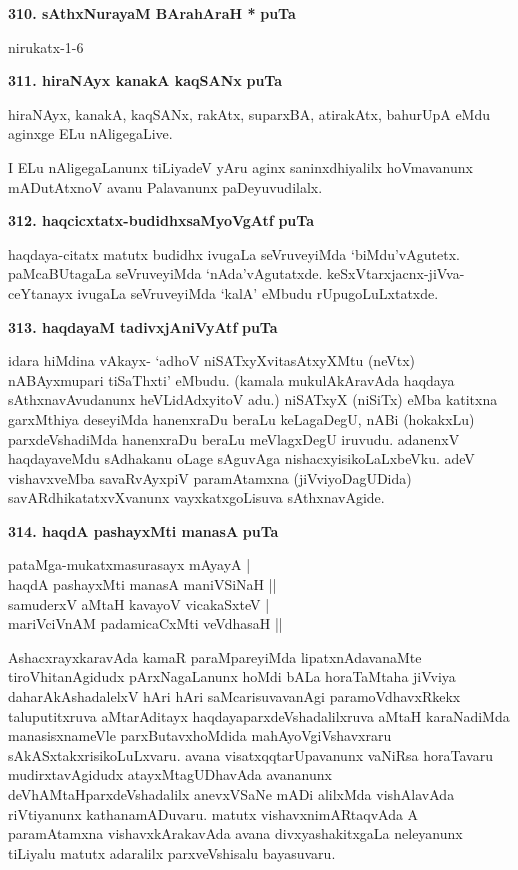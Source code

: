 \noindent
\textbf{310. sAthxNurayaM BArahAraH *} \hfill {\bf puTa }

\hfill nirukatx-1-6

\medskip
\noindent
\textbf{311. hiraNAyx kanakA kaqSANx} \hfill {\bf puTa }

\smallskip
hiraNAyx, kanakA, kaqSANx, rakAtx, suparxBA, atirakAtx, bahurUpA eMdu aginxge ELu nAligegaLive.

I ELu nAligegaLanunx tiLiyadeV yAru aginx saninxdhiyalilx hoVmavanunx mADutAtxnoV avanu Palavanunx paDeyuvudilalx.

\noindent
\textbf{312. haqcicxtatx-budidhxsaMyoVgAtf} \hfill {\bf puTa }

\smallskip
haqdaya-citatx matutx budidhx ivugaLa seVruveyiMda  `biMdu'vAgutetx. paMcaBUtagaLa seVruveyiMda `nAda'vAgutatxde. keSxVtarxjacnx-jiVva-ceYtanayx ivugaLa seVruveyiMda  `kalA' eMbudu rUpugoLuLxtatxde.

\medskip
\noindent
\textbf{313. haqdayaM tadivxjAniVyAtf} \hfill {\bf puTa }

\smallskip
idara hiMdina vAkayx- `adhoV niSATxyXvitasAtxyXMtu (neVtx) nABAyxmupari tiSaThxti' eMbudu. (kamala mukulAkAravAda haqdaya sAthxnavAvudanunx heVLidAdxyitoV adu.) niSATxyX (niSiTx) eMba katitxna garxMthiya deseyiMda hanenxraDu beraLu keLagaDegU, nABi (hokakxLu) parxdeVshadiMda hanenxraDu beraLu meVlagxDegU iruvudu. adanenxV haqdayaveMdu sAdhakanu oLage sAguvAga nishacxyisikoLaLxbeVku. adeV vishavxveMba savaRvAyxpiV paramAtamxna (jiVviyoDagUDida) savARdhikatatxvXvanunx vayxkatxgoLisuva sAthxnavAgide.

\medskip
\noindent
\textbf{314. haqdA pashayxMti manasA} \hfill {\bf puTa }

\begin{shloka}
pataMga-mukatxmasurasayx mAyayA |\\
haqdA pashayxMti manasA maniVSiNaH ||\\
samuderxV aMtaH kavayoV vicakaSxteV |\\
mariVciVnAM padamicaCxMti veVdhasaH ||
\end{shloka}


AshacxrayxkaravAda kamaR paraMpareyiMda lipatxnAdavanaMte tiroVhitanAgidudx pArxNagaLanunx hoMdi bALa horaTaMtaha jiVviya daharAkAshadalelxV hAri hAri saMcarisuvavanAgi paramoVdhavxRkekx taluputitxruva aMtarAditayx haqdayaparxdeVshadalilxruva aMtaH karaNadiMda manasisxnameVle parxButavxhoMdida mahAyoVgiVshavxraru sAkASxtakxrisikoLuLxvaru. avana visatxqqtarUpavanunx vaNiRsa horaTavaru mudirxtavAgidudx atayxMtagUDhavAda avananunx deVhAMtaHparxdeVshadalilx anevxVSaNe mADi alilxMda vishAlavAda riVtiyanunx kathanamADuvaru. matutx vishavxnimARtaqvAda A paramAtamxna vishavxkArakavAda avana divxyashakitxgaLa neleyanunx tiLiyalu matutx adaralilx parxveVshisalu bayasuvaru.

